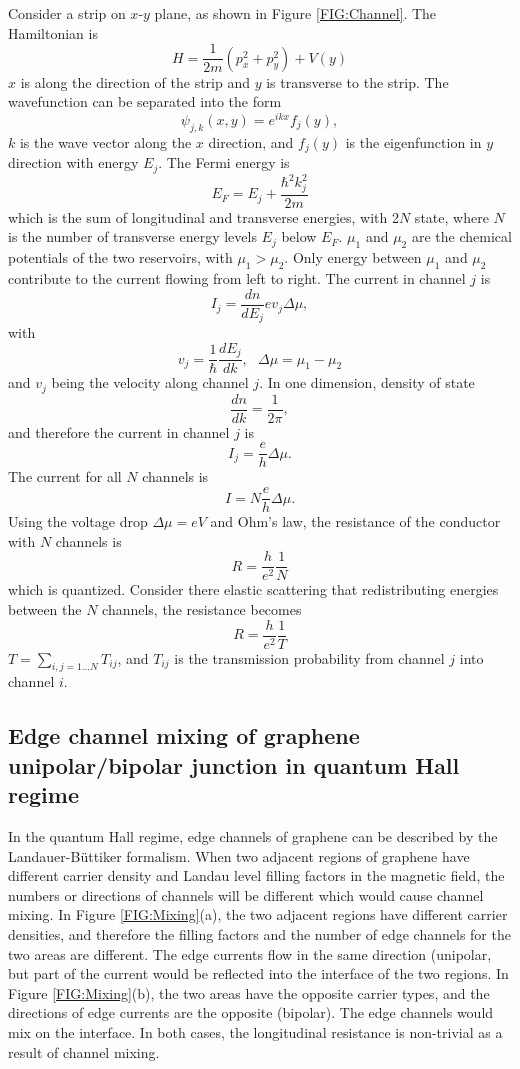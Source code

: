 \documentclass[pdflatex, sectionletters, 12pt]{pittetd}    %
\begin{document}
Consider a strip on $x$-$y$ plane, as shown in Figure \ref{FIG:Channel}. The Hamiltonian is
$$
H = \frac{1}{2m}\left(p_x^2 + p_y^2\right) + V(y)
$$ 
$x$ is along the direction of the strip and $y$ is transverse to the strip. The wavefunction can be separated into the form
$$
\psi_{j, k}(x, y) = e^{ikx} f_j(y),
$$
$k$ is the wave vector along the $x$ direction, and $f_j(y)$ is the eigenfunction in $y$ direction with energy $E_j$. The Fermi energy is 
$$
E_F = E_j + \frac{\hbar^2 k_j^2}{2m}
$$
which is the sum of longitudinal and transverse energies, with 2$N$ state, where $N$ is the number of transverse energy levels $E_j$ below $E_F$. $\mu_1$ and $\mu_2$ are the chemical potentials of the two reservoirs, with $\mu_1 > \mu_2$. Only energy between $\mu_1$ and $\mu_2$ contribute to the current flowing from left to right. The current in channel $j$ is 
$$
I_j = \frac{dn}{dE_j}ev_j\Delta\mu,
$$
with 
$$
v_j = \frac{1}{\hbar}\frac{dE_j}{dk}, \ \ \ \Delta \mu = \mu_1 - \mu_2
$$
and $v_j$ being the velocity along channel $j$. In one dimension, density of state
$$
\frac{dn}{dk} = \frac{1}{2\pi},
$$
and therefore the current in channel $j$ is
$$
I_j = \frac{e}{h}\Delta\mu.
$$
The current for all $N$ channels is
$$I = N\frac{e}{h}\Delta\mu.$$
Using the voltage drop $\Delta \mu = eV$ and Ohm's law, the resistance of the conductor with $N$ channels is
$$
R = \frac{h}{e^2}\frac{1}{N}
$$ 
which is quantized. Consider there elastic scattering that redistributing energies between the $N$ channels, the resistance becomes\cite{buttiker1988absence}
$$
R = \frac{h}{e^2}\frac{1}{T}
$$
$T = \sum_{i,j=1\ldots N} T_{ij}$, and $T_{ij}$ is the transmission probability from channel $j$ into channel $i$. 

\subsection{Edge channel mixing of graphene unipolar/bipolar junction in quantum Hall regime}

In the quantum Hall regime, edge channels of graphene can be described by the Landauer-B{\"u}ttiker formalism. When two adjacent regions of graphene have different carrier density and Landau level filling factors in the magnetic field, the numbers or directions of channels will be different which would cause channel mixing. In Figure \ref{FIG:Mixing}(a), the two adjacent regions have different carrier densities, and therefore the filling factors and the number of edge channels for the two areas are different. The edge currents flow in the same direction (unipolar, but part of the current would be reflected into the interface of the two regions. In Figure \ref{FIG:Mixing}(b), the two areas have the opposite carrier types, and the directions of edge currents are the opposite (bipolar). The edge channels would mix on the interface. In both cases, the longitudinal resistance is non-trivial as a result of channel mixing.
\end{document}
